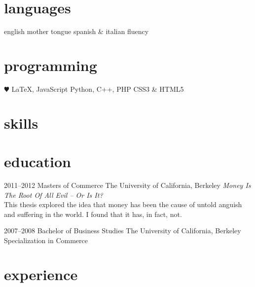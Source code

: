 \documentclass[a4paper]{cv-friggeri-k}
\begin{document}
\begin{aside}
\section{languages}
english mother tongue
spanish \& italian fluency
\section{programming}
{\color{red} $\varheartsuit$} \LaTeX, JavaScript
Python, C++, PHP
CSS3 \& HTML5
\section{skills}
\end{aside}


\section{education}

\begin{entrylist}


\entry
{2011--2012}
{Masters {\normalfont of Commerce}}
{The University of California, Berkeley}
{\emph{Money Is The Root Of All Evil -- Or Is It?} \\ This thesis explored the idea that money has been the cause of untold anguish and suffering in the world. I found that it has, in fact, not.}


\entry
{2007--2008}
{Bachelor {\normalfont of Business Studies}}
{The University of California, Berkeley}
{Specialization in Commerce}


\end{entrylist}


\section{experience}
\end{document}
